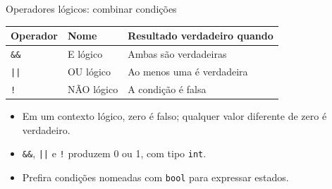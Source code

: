 \begin{frame}{Operadores lógicos: combinar condições}
\begin{center}
\begin{tabular}{lll}
\toprule
Operador & Nome & Resultado verdadeiro quando \\
\midrule
\texttt{\&\&} & E lógico & Ambas são verdadeiras \\
\texttt{||} & OU lógico & Ao menos uma é verdadeira \\
\texttt{!} & NÃO lógico & A condição é falsa \\
\bottomrule
\end{tabular}
\end{center}
\begin{itemize}
\item Em um contexto lógico, zero é falso; qualquer valor diferente de zero é verdadeiro.
\item \texttt{\&\&}, \texttt{||} e \texttt{!} produzem 0 ou 1, com tipo \texttt{int}.
\item Prefira condições nomeadas com \texttt{bool} para expressar estados.
\end{itemize}
\end{frame}
